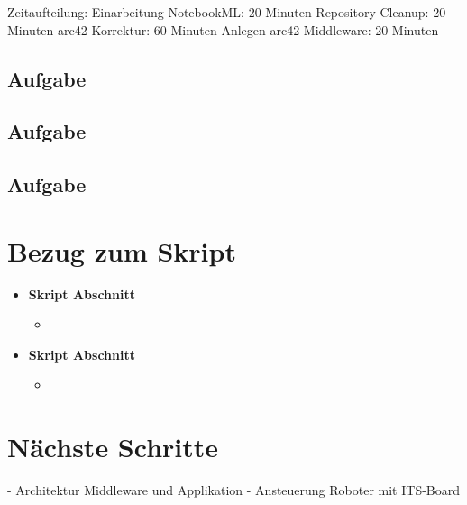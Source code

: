 \documentclass{article}
\begin{document}
Zeitaufteilung:
Einarbeitung NotebookML: 20 Minuten
Repository Cleanup: 20 Minuten
arc42 Korrektur: 60 Minuten
Anlegen arc42 Middleware: 20 Minuten


\subsection{Aufgabe}


\subsection{Aufgabe}


\subsection{Aufgabe}


\section{Bezug zum Skript}

\begin{itemize}
	\item \textbf{Skript Abschnitt}
		\begin{itemize}
			\item 
		\end{itemize}
	\item \textbf{Skript Abschnitt}
		\begin{itemize}
			\item 
		\end{itemize}
\end{itemize}
 
\section{Nächste Schritte}
- Architektur Middleware und Applikation
- Ansteuerung Roboter mit ITS-Board
\end{document}
